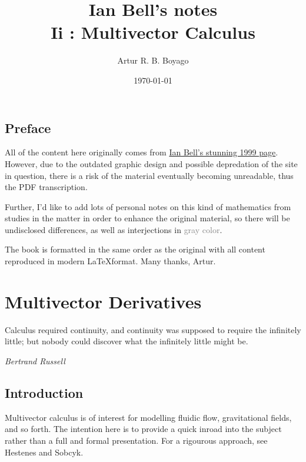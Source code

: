 \documentclass[a4paper]{book}
\numberwithin{equation}{chapter}
\begin{document}
\newcommand{\titulo}{\textbf{Ian Bell's notes}\\ \textbf{Ii : Multivector Calculus}}
\newcommand{\abnTeX}{abn\TeX}

\title{\titulo}

\author{
Artur R. B. Boyago
}
\date{\today}

\maketitle

\tableofcontents

\section{Preface}

All of the content here originally comes from \href{http://www.iancgbell.clara.net/maths/geoalg.htm}{Ian Bell's
stunning 1999 page}. However,
due to the outdated graphic design and possible depredation of the site in question, there is a 
risk of the material eventually becoming unreadable, thus the PDF transcription.

\vspace{\baselineskip}

Further, I'd like to add lots of personal notes on this kind of mathematics from  studies
in the matter in order to enhance the original material, so there will be undisclosed
differences, as well as interjections in \textcolor{gray}{gray color}.

The book is formatted in the same order as the original
with all content reproduced in modern \LaTeX format. Many thanks, Artur.




\chapter{Multivector Derivatives}
\epigraph{Calculus required continuity, and continuity was supposed to require the infinitely little; but nobody could discover what the infinitely little might be.}{\textit{Bertrand Russell}}

\section{Introduction}

Multivector calculus is of interest for modelling fluidic flow, gravitational fields, and so
forth. The intention here is to provide a quick inroad into the subject rather than a full 
and formal presentation. For a rigourous approach, see Hestenes and Sobcyk.
\end{document}
